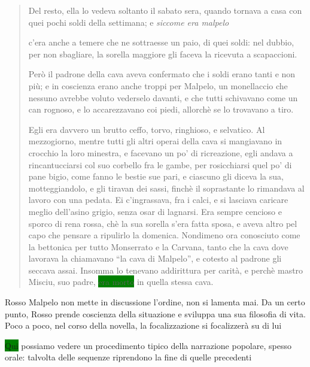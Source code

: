 \documentclass{book}
\newcounter{mar}
\newcommand{\mar}[2]{
\addtocounter{mar}{1}
\hspace{-0.73em}\textsuperscript{\hyperref[\thechapter.\themar]{\themar}}\marginpar{\footnotesize\textbf{\themar}\label{\thechapter.\themar}. #2}\hspace{-0.4em}
}
\newcommand{\mat}[1]{\mar{gg}{#1}}
\begin{document}
\begin{quote} 
 Del resto, ella lo vedeva soltanto il sabato sera, quando tornava a casa con quei pochi soldi della settimana; e \textit{siccome era malpelo}\mat{conseguenza logica basata sul nulla} c’era anche a temere che ne sottraesse un paio, di quei soldi: nel dubbio, per non sbagliare, la sorella maggiore gli faceva la ricevuta a scapaccioni.
 
 Però il padrone della cava aveva confermato che i soldi erano tanti e non più; e in coscienza erano anche troppi per Malpelo, un monellaccio che nessuno avrebbe voluto vederselo davanti, e che tutti schivavano come un can rognoso, e lo accarezzavano coi piedi, allorchè se lo trovavano a tiro.
 
 Egli era davvero un brutto ceffo, torvo, ringhioso, e selvatico. Al mezzogiorno, mentre tutti gli altri operai della cava si mangiavano in crocchio la loro minestra, e facevano un po’ di ricreazione, egli andava a rincantucciarsi col suo corbello fra le gambe, per rosicchiarsi quel po’ di pane bigio, come fanno le bestie sue pari, e ciascuno gli diceva la sua, motteggiandolo, e gli tiravan dei sassi, finchè il soprastante lo rimandava al lavoro con una pedata. Ei c’ingrassava, fra i calci, e si lasciava caricare meglio dell’asino grigio, senza osar di lagnarsi. Era sempre cencioso e sporco di rena rossa, chè la sua sorella s’era fatta sposa, e aveva altro pel capo che pensare a ripulirlo la domenica. Nondimeno ora conosciuto come la bettonica per tutto Monserrato e la Carvana, tanto che la cava dove lavorava la chiamavano ``la cava di Malpelo'', e cotesto al padrone gli seccava assai. Insomma lo tenevano addirittura per carità, e perchè mastro Misciu, suo padre, \colorbox{green}{era morto} in quella stessa cava.
 \end{quote}
 
 Rosso Malpelo non mette in discussione l'ordine, non si lamenta mai. Da un certo punto, Rosso prende coscienza della situazione e sviluppa una sua filosofia di vita. Poco a poco, nel corso della novella, la focalizzazione si focalizzerà su di lui
 
 \colorbox{green}{Qui} possiamo vedere un procedimento tipico della narrazione popolare, spesso orale: talvolta delle sequenze riprendono la fine di quelle precedenti
 
\end{document}
